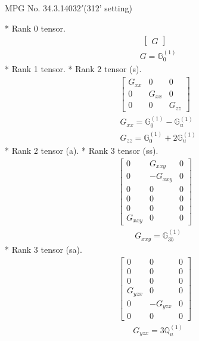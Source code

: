 \documentclass[fleqn,8pt,landscape]{jsarticle}
\begin{document}
\setcounter{MaxMatrixCols}{32}

\renewcommand{\tablename}{Table~}
\renewcommand{\figurename}{Figure~}
\begin{center}
\LARGE
MPG No. 34.3.140\quad$32'$\quad(312' setting)
\end{center}
* Rank 0 tensor.
\begin{align*}
\begin{bmatrix} G \end{bmatrix}
\end{align*}
\begin{align*}
& G = \mathbb{G}_{0}^{(1)}
\end{align*}
* Rank 1 tensor.
* Rank 2 tensor (s).
\begin{align*}
\begin{bmatrix} G_{xx} & 0 & 0 \\ 0 & G_{xx} & 0 \\ 0 & 0 & G_{zz} \end{bmatrix}
\end{align*}
\begin{align*}
& G_{xx} = \mathbb{G}_{0}^{(1)} - \mathbb{G}_{u}^{(1)} \\
& G_{zz} = \mathbb{G}_{0}^{(1)} + 2 \mathbb{G}_{u}^{(1)}
\end{align*}
* Rank 2 tensor (a).
* Rank 3 tensor (ss).
\begin{align*}
\begin{bmatrix} 0 & G_{xxy} & 0 \\ 0 & - G_{xxy} & 0 \\ 0 & 0 & 0 \\ 0 & 0 & 0 \\ 0 & 0 & 0 \\ G_{xxy} & 0 & 0 \end{bmatrix}
\end{align*}
\begin{align*}
& G_{xxy} = \mathbb{G}_{3b}^{(1)}
\end{align*}
* Rank 3 tensor (sa).
\begin{align*}
\begin{bmatrix} 0 & 0 & 0 \\ 0 & 0 & 0 \\ 0 & 0 & 0 \\ G_{yzx} & 0 & 0 \\ 0 & - G_{yzx} & 0 \\ 0 & 0 & 0 \end{bmatrix}
\end{align*}
\begin{align*}
& G_{yzx} = 3 \mathbb{Q}_{u}^{(1)}
\end{align*}
\end{document}
